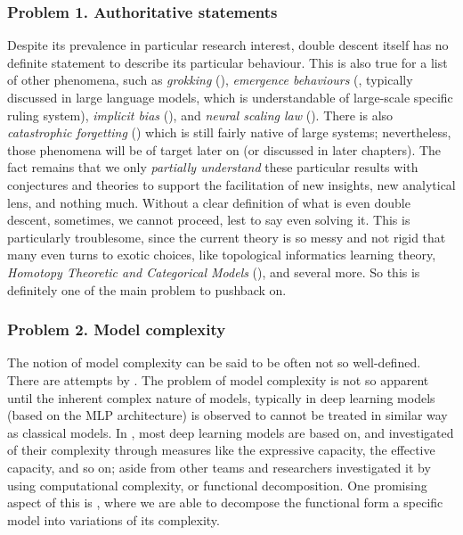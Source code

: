 \documentclass[10pt]{article} %
\begin{document}
\subsubsection*{Problem 1. Authoritative statements}
Despite its prevalence in particular research interest, double descent itself has no definite statement to describe its particular behaviour. This is also true for a list of other phenomena, such as \textit{grokking} (\cite{power2022grokkinggeneralizationoverfittingsmall}), \textit{emergence behaviours} (\cite{wei2022emergentabilitieslargelanguage}, typically discussed in large language models, which is understandable of large-scale specific ruling system), \textit{implicit bias} (\cite{soudry2024implicitbiasgradientdescent}), and \textit{neural scaling law} (\cite{kaplan2020scalinglawsneurallanguage,wei2022emergentabilitieslargelanguage}). There is also \textit{catastrophic forgetting} (\cite{vandeven2024continuallearningcatastrophicforgetting}) which is still fairly native of large systems; nevertheless, those phenomena will be of target later on (or discussed in later chapters). The fact remains that we only \textit{partially understand} these particular results with conjectures and theories to support the facilitation of new insights, new analytical lens, and nothing much. Without a clear definition of what is even double descent, sometimes, we cannot proceed, lest to say even solving it. This is particularly troublesome, since the current theory is so messy and not rigid that many even turns to exotic choices, like topological informatics learning theory, \textit{Homotopy Theoretic and Categorical Models} (\cite{Manin_2024}), and several more. So this is definitely one of the main problem to pushback on. 

\subsubsection*{Problem 2. Model complexity}
The notion of model complexity can be said to be often not so well-defined. There are attempts by \cite{hu2021modelcomplexitydeeplearning,luo2024investigatingimpactmodelcomplexity,barceló2020modelinterpretabilitylenscomputational,Molnar_2020,janik2021complexitydeepneuralnetworks}. The problem of model complexity is not so apparent until the inherent complex nature of models, typically in deep learning models (based on the MLP architecture) is observed to cannot be treated in similar way as classical models. In \cite{hu2021modelcomplexitydeeplearning}, most deep learning models are based on, and investigated of their complexity through measures like the expressive capacity, the effective capacity, and so on; aside from other teams and researchers investigated it by using computational complexity, or functional decomposition. One promising aspect of this is \cite{Molnar_2020}, where we are able to decompose the functional form a specific model into variations of its complexity. 
\end{document}
